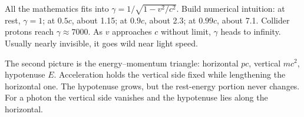 \begin{mainline}
All the mathematics fits into \(\gamma=1/\sqrt{1-v^{2}/c^{2}}\). Build numerical intuition: at rest, \(\gamma=1\); at \(0.5c\), about 1.15; at \(0.9c\), about 2.3; at \(0.99c\), about 7.1. Collider protons reach \(\gamma\approx7000\). As \(v\) approaches \(c\) without limit, \(\gamma\) heads to infinity. Usually nearly invisible, it goes wild near light speed.
\end{mainline}

\begin{center}
\end{center}

\begin{mainline}
The second picture is the energy--momentum triangle: horizontal \(pc\), vertical \(mc^{2}\), hypotenuse \(E\). Acceleration holds the vertical side fixed while lengthening the horizontal one. The hypotenuse grows, but the rest-energy portion never changes. For a photon the vertical side vanishes and the hypotenuse lies along the horizontal.
\end{mainline}

\begin{center}
\end{center}

